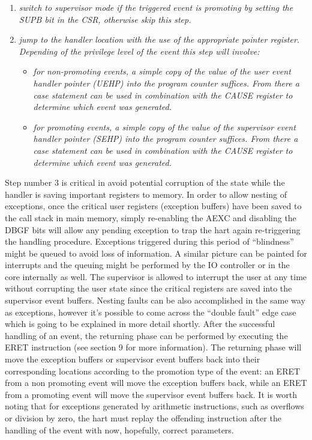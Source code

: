 \begin{enumerate}
            \item \textit{switch to supervisor mode if the triggered event is promoting by setting the SUPB bit in the CSR, otherwise skip this step.}

            \item \textit{jump to the handler location with the use of the appropriate pointer register. Depending of the privilege level of the event this step will involve:}

                \begin{itemize}

                    \item \textit{for non-promoting events, a simple copy of the value of the user event handler pointer (UEHP) into the program counter suffices. From there a case statement can be used in combination with the CAUSE register to determine which event was generated.}

                    \item \textit{for promoting events, a simple copy of the value of the supervisor event handler pointer (SEHP) into the program counter suffices. From there a case statement can be used in combination with the CAUSE register to determine which event was generated.}

                \end{itemize}

        \end{enumerate}

        Step number 3 is critical in avoid potential corruption of the state while the handler is saving important registers to memory. In order to allow nesting of exceptions, once the critical user registers (exception buffers) have been saved to the call stack in main memory, simply re-enabling the AEXC and disabling the DBGF bits will allow any pending exception to trap the hart again re-triggering the handling procedure. Exceptions triggered during this period of ``blindness'' might be queued to avoid loss of information. A similar picture can be painted for interrupts and the queuing might be performed by the IO controller or in the core internally as well. The supervisor is allowed to interrupt the user at any time without corrupting the user state since the critical registers are saved into the supervisor event buffers. Nesting faults can be also accomplished in the same way as exceptions, however it's possible to come across the ``double fault'' edge case which is going to be explained in more detail shortly. After the successful handling of an event, the returning phase can be performed by executing the ERET instruction (see section 9 for more information). The returning phase will move the exception buffers or supervisor event buffers back into their corresponding locations according to the promotion type of the event: an ERET from a non promoting event will move the exception buffers back, while an ERET from a promoting event will move the supervisor event buffers back. It is worth noting that for exceptions generated by arithmetic instructions, such as overflows or division by zero, the hart must replay the offending instruction after the handling of the event with now, hopefully, correct parameters.

